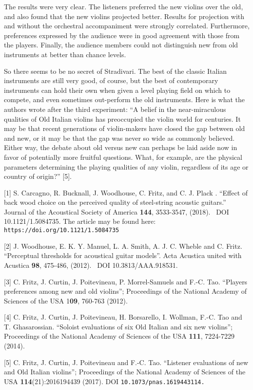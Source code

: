   The results were very clear. The listeners preferred the new violins over the 
  old, and also found that the new violins projected better. Results for 
  projection with and without the orchestral accompaniment were strongly 
  correlated. Furthermore, preferences expressed by the audience were in good 
  agreement with those from the players. Finally, the audience members could 
  not distinguish new from old instruments at better than chance levels. 

  So there seems to be no secret of Stradivari. The best of the classic Italian 
  instruments are still very good, of course, but the best of contemporary 
  instruments can hold their own when given a level playing field on which to 
  compete, and even sometimes out-perform the old instruments. Here is what the 
  authors wrote after the third experiment: “A belief in the near-miraculous 
  qualities of Old Italian violins has preoccupied the violin world for 
  centuries. It may be that recent generations of violin-makers have closed the 
  gap between old and new, or it may be that the gap was never so wide as 
  commonly believed. Either way, the debate about old versus new can perhaps be 
  laid aside now in favor of potentially more fruitful questions. What, for 
  example, are the physical parameters determining the playing qualities of any 
  violin, regardless of its age or country of origin?” [5]. 



  \sectionreferences{}[1] S. Carcagno, R. Bucknall, J. Woodhouse, C. Fritz, and 
  C. J. Plack . ``Effect of back wood choice on the perceived quality of 
  steel-string acoustic guitars.'' Journal of the Acoustical Society of America 
  \textbf{144}, 3533-3547, (2018).~ DOI 10.1121/1.5084735. The article may be 
  found here: \tt{}https://doi.org/10.1121/1.5084735\rm{} 

  [2] J. Woodhouse, E. K. Y. Manuel, L. A. Smith, A. J. C. Wheble and C. Fritz. 
  ``Perceptual thresholds for acoustical guitar models''. Acta Acustica united 
  with Acustica\textbf{ 98}, 475-486, (2012).~ DOI 10.3813/AAA.918531. 

  [3] C. Fritz, J. Curtin, J. Poitevineau, P. Morrel-Samuels and F.-C. Tao. 
  ``Players preferences among new and old violins''; Proceedings of the 
  National Academy of Sciences of the USA 1\textbf{09}, 760-763 (2012). 

  [4] C. Fritz, J. Curtin, J. Poitevineau, H. Borsarello, I. Wollman, F.-C. Tao 
  and T. Ghasarossian. ``Soloist evaluations of six Old Italian and six new 
  violins''; Proceedings of the National Academy of Sciences of the USA 
  \textbf{111}, 7224-7229 (2014). 

  [5] C. Fritz, J. Curtin, J. Poitevineau and F.-C. Tao. ``Listener evaluations 
  of new and Old Italian violins''; Proceedings of the National Academy of 
  Sciences of the USA \textbf{114}(21):2016194439 (2017). DOI 
  \tt{}10.1073/pnas.1619443114\rm{}. 